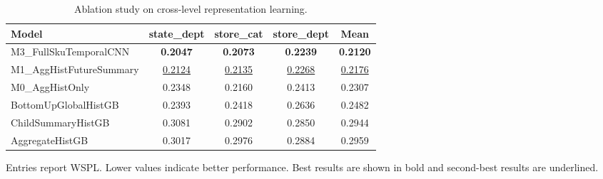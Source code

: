 \begin{table}[H]
\centering
\caption{Ablation study on cross-level representation learning.}
\label{tab:ablation}
\begin{threeparttable}
\begin{tabular}{lcccc}
\toprule
Model & state\_dept & store\_cat & store\_dept & Mean \\
\midrule
M3\_FullSkuTemporalCNN & \textbf{0.2047} & \textbf{0.2073} & \textbf{0.2239} & \textbf{0.2120} \\
M1\_AggHistFutureSummary & \underline{0.2124} & \underline{0.2135} & \underline{0.2268} & \underline{0.2176} \\
M0\_AggHistOnly & 0.2348 & 0.2160 & 0.2413 & 0.2307 \\
BottomUpGlobalHistGB & 0.2393 & 0.2418 & 0.2636 & 0.2482 \\
ChildSummaryHistGB & 0.3081 & 0.2902 & 0.2850 & 0.2944 \\
AggregateHistGB & 0.3017 & 0.2976 & 0.2884 & 0.2959 \\
\bottomrule
\end{tabular}
\begin{tablenotes}
\footnotesize \item Entries report WSPL. Lower values indicate better performance. Best results are shown in bold and second-best results are underlined.
\end{tablenotes}
\end{threeparttable}
\end{table}
